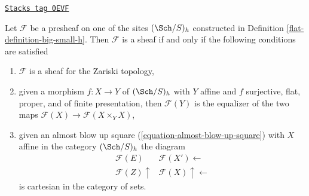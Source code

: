 \begin{proposition}[Check h]
\label{flat-proposition-check-h}
\href{https://stacks.math.columbia.edu/tag/0EVF}{\texttt{Stacks tag 0EVF}}

Let $\mathcal{F}$ be a presheaf on one of the sites $(\Sch/S)_h$
constructed in Definition \ref{flat-definition-big-small-h}.
Then $\mathcal{F}$ is a sheaf if and only if the following
conditions are satisfied
\begin{enumerate}
\item $\mathcal{F}$ is a sheaf for the Zariski topology,
\item given a morphism $f : X \to Y$ of $(\Sch/S)_h$ with $Y$ affine
and $f$ surjective, flat, proper, and of finite presentation, then
$\mathcal{F}(Y)$ is the equalizer of the two maps
$\mathcal{F}(X) \to \mathcal{F}(X \times_Y X)$,
\item given an almost blow up square (\ref{equation-almost-blow-up-square})
with $X$ affine in the category $(\Sch/S)_h$ the diagram
$$
\begin{array}{cc}\mathcal{F}(E) & \mathcal{F}(X') \longleftarrow \\ \mathcal{F}(Z) \uparrow & \mathcal{F}(X) \uparrow\longleftarrow\end{array}
$$
is cartesian in the category of sets.
\end{enumerate}
\end{proposition}


